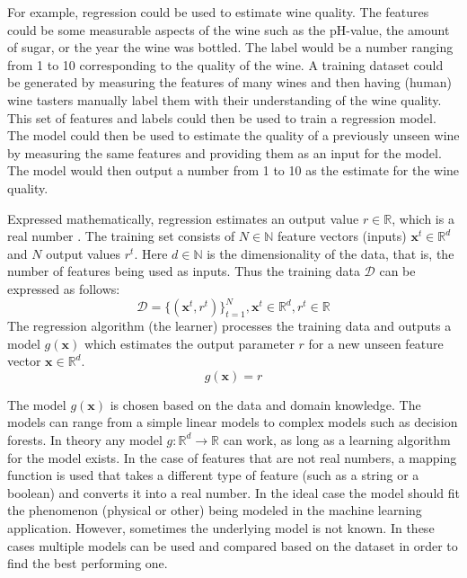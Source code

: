 For example, regression could be used to estimate wine quality.
The features could be some measurable aspects of the wine such as the pH-value, the amount of sugar, or the year the wine was bottled.
The label would be a number ranging from 1 to 10 corresponding to the quality of the wine.
A training dataset could be generated by measuring the features of many wines and then having (human) wine tasters manually label them with their understanding of the wine quality.
This set of features and labels could then be used to train a regression model.
The model could then be used to estimate the quality of a previously unseen wine by measuring the same features and providing them as an input for the model.
The model would then output a number from 1 to 10 as the estimate for the wine quality.

Expressed mathematically, regression estimates an output value $r \in \mathbb{R}$, which is a real number \cite{alpaydin}.
The training set consists of $N \in \mathbb{N}$ feature vectors (inputs) $\mathbf{x}^t \in \mathbb{R}^d$ and $N$ output values $r^t$.
Here $d \in \mathbb{N}$ is the dimensionality of the data, that is, the number of features being used as inputs. Thus the training data $\mathcal{D}$ can be expressed as follows:
$$\mathcal{D} = \{(\mathbf{x}^t, r^t)\}_{t=1}^N, \mathbf{x}^t \in \mathbb{R}^d, r^t \in \mathbb{R}$$
The regression algorithm (the learner) processes the training data and outputs a model $g(\mathbf{x})$ which estimates the output parameter $r$ for a new unseen feature vector $\mathbf{x} \in \mathbb{R}^d$.
$$g(\mathbf{x}) = r$$

The model $g(\mathbf{x})$ is chosen based on the data and domain knowledge. 
The models can range from a simple linear models to complex models such as decision forests.
In theory any model $g: \mathbb{R}^d \rightarrow \mathbb{R}$ can work,
as long as a learning algorithm for the model exists.
In the case of features that are not real numbers, a mapping function is used that takes a different type of feature (such as a string or a boolean) and converts it into a real number.
In the ideal case the model should fit the phenomenon (physical or other) being modeled in the machine learning application.
However, sometimes the underlying model is not known. 
In these cases multiple models can be used and compared based on the dataset in order to find the best performing one.

